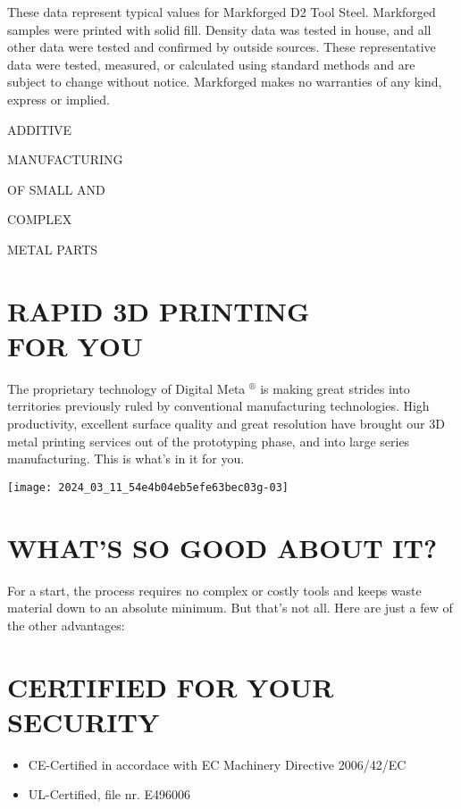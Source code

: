 \documentclass[10pt]{article}
\begin{document}
These data represent typical values for Markforged D2 Tool Steel. Markforged samples were printed with solid fill. Density data was tested in house, and all other data were tested and confirmed by outside sources. These representative data were tested, measured, or calculated using standard methods and are subject to change without notice. Markforged makes no warranties of any kind, express or implied.

ADDITIVE

MANUFACTURING

OF SMALL AND

COMPLEX

METAL PARTS

\section*{RAPID 3D PRINTING \\
 FOR YOU}
The proprietary technology of Digital Meta ${ }^{\circledR}$ is making great strides into territories previously ruled by conventional manufacturing technologies. High productivity, excellent surface quality and great resolution have brought our 3D metal printing services out of the prototyping phase, and into large series manufacturing. This is what's in it for you.

\begin{center}
\texttt{[image: 2024\_03\_11\_54e4b04eb5efe63bec03g-03]}
\end{center}

\section*{WHAT'S SO GOOD ABOUT IT?}
For a start, the process requires no complex or costly tools and keeps waste material down to an absolute minimum. But that's not all. Here are just a few of the other advantages:

\section*{CERTIFIED FOR YOUR SECURITY}
\begin{itemize}
  \item CE-Certified in accordace with EC Machinery Directive 2006/42/EC

  \item UL-Certified, file nr. E496006

\end{itemize}
\end{document}
